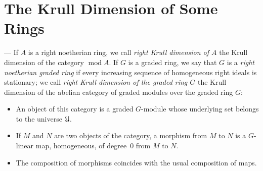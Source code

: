 %
%

\section{The Krull Dimension of Some Rings}

--- If $A$ is a right noetherian ring, we call \emph{right Krull
dimension of $A$} the Krull dimension of the category
$\operatorname{mod}A$. If $G$ is a graded ring, we say that $G$ is a
\emph{right noetherian graded ring} if every increasing sequence of
homogeneous right ideals is stationary; we call \emph{right Krull
dimension of the graded ring $G$} the Krull dimension of the abelian
category of graded modules over the graded ring $G$:
\begin{itemize}
\item An object of this category is a graded $G$-module whose
  underlying set belongs to the universe $\mathfrak{U}$.
\item If $M$ and $N$ are two objects of the category, a morphism from
  $M$ to $N$ is a $G$-linear map, homogeneous, of degree~$0$ from $M$
  to $N$.
\item The composition of morphisms coincides with the usual
  composition of maps.
\end{itemize}

